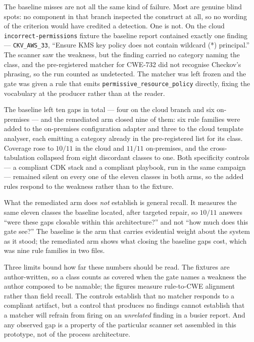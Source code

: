 The baseline misses are not all the same kind of failure. Most are genuine blind
spots: no component in that branch inspected the construct at all, so no wording
of the criterion would have credited a detection. One is not. On the cloud
\texttt{incorrect-permissions} fixture the baseline report contained exactly one
finding --- \texttt{CKV\_AWS\_33}, ``Ensure KMS key policy does not contain
wildcard (*) principal.'' The scanner saw the weakness, but the finding carried
no category naming the class, and the pre-registered matcher for CWE-732 did not
recognise Checkov's phrasing, so the run counted as undetected. The matcher was
left frozen and the gate was given a rule that emits
\texttt{permissive\_resource\_policy} directly, fixing the vocabulary at the
producer rather than at the reader.

The baseline left ten gaps in total --- four on the cloud branch and six
on-premises --- and the remediated arm closed nine of them: six rule families
were added to the on-premises configuration adapter and three to the cloud
template analyser, each emitting a category already in the pre-registered list
for its class. Coverage rose to $10/11$ in the cloud and $11/11$ on-premises,
and the cross-tabulation collapsed from eight discordant classes to one. Both
specificity controls --- a compliant CDK stack and a compliant playbook, run in
the same campaign --- remained silent on every one of the eleven classes in both
arms, so the added rules respond to the weakness rather than to the fixture.

What the remediated arm does \emph{not} establish is general recall. It measures
the same eleven classes the baseline located, after targeted repair, so $10/11$
answers ``were these gaps closable within this architecture?'' and not ``how much
does this gate see?'' The baseline is the arm that carries evidential weight
about the system as it stood; the remediated arm shows what closing the baseline
gaps cost, which was nine rule families in two files.

Three limits bound how far these numbers should be read. The fixtures are
author-written, so a class counts as covered when the gate names a weakness the
author composed to be namable; the figures measure rule-to-CWE alignment rather
than field recall. The controls establish that no matcher responds to a compliant
artifact, but a control that produces no findings cannot establish that a matcher
will refrain from firing on an \emph{unrelated} finding in a busier report. And
any observed gap is a property of the particular scanner set assembled in this
prototype, not of the process architecture.

